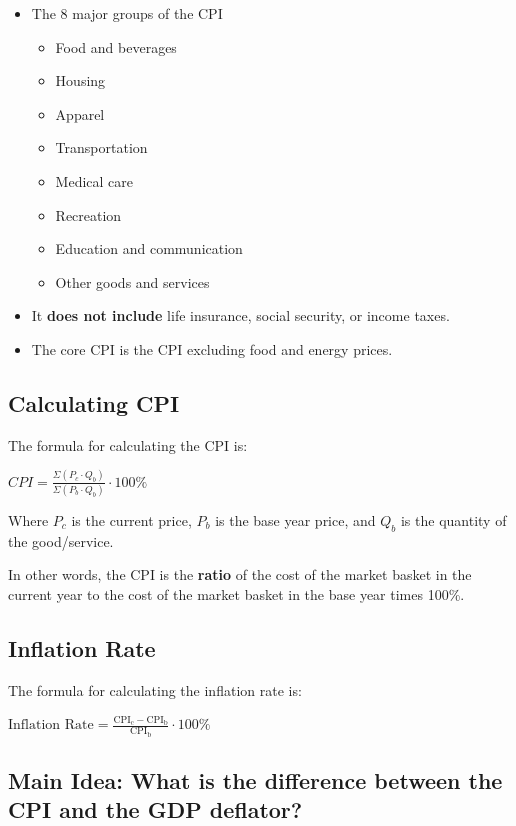 \documentclass[
  letterpaper,
  DIV=11,
  numbers=noendperiod]{scrartcl}
\providecommand{\tightlist}{%
  \setlength{\itemsep}{0pt}\setlength{\parskip}{0pt}}\usepackage{longtable,booktabs,array}
\begin{document}
\begin{itemize}
\tightlist
\item
  The 8 major groups of the CPI

  \begin{itemize}
  \tightlist
  \item
    Food and beverages
  \item
    Housing
  \item
    Apparel
  \item
    Transportation
  \item
    Medical care
  \item
    Recreation
  \item
    Education and communication
  \item
    Other goods and services
  \end{itemize}
\item
  It \textbf{does not include} life insurance, social security, or
  income taxes.
\item
  The core CPI is the CPI excluding food and energy prices.
\end{itemize}

\subsection{Calculating CPI}\label{calculating-cpi}

The formula for calculating the CPI is:

\(CPI = \frac{\Sigma (P_c \cdot Q_b)}{\Sigma (P_b \cdot Q_b)} \cdot 100\%\)

Where \(P_c\) is the current price, \(P_b\) is the base year price, and
\(Q_b\) is the quantity of the good/service.

In other words, the CPI is the \textbf{ratio} of the cost of the market
basket in the current year to the cost of the market basket in the base
year times 100\%.

\subsection{Inflation Rate}\label{inflation-rate}

The formula for calculating the inflation rate is:

\(\text{Inflation Rate} = \frac{\text{CPI}_{\text{c}} - \text{CPI}_{\text{b}}}{\text{CPI}_{\text{b}}} \cdot 100\%\)

\subsection{Main Idea: What is the difference between the CPI and the
GDP
deflator?}\label{main-idea-what-is-the-difference-between-the-cpi-and-the-gdp-deflator}
\end{document}
